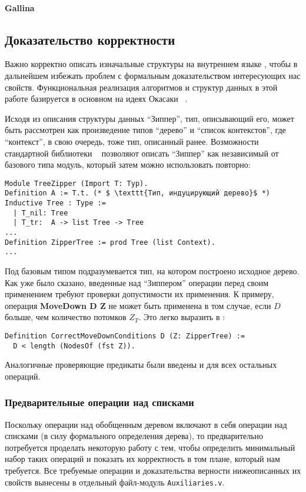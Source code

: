 \paragraph{Gallina}


\subsection{Доказательство корректности}

Важно корректно описать изначальные структуры на внутреннем языке \tcoq, чтобы в дальнейшем избежать проблем с формальным доказательством интересующих нас свойств. Функциональная реализация алгоритмов и структур данных в этой работе базируется в основном на идеях Окасаки ~\autocite{Okasaki1996}.

Исходя из описания структуры данных ``Зиппер'', тип, описывающий его, может быть рассмотрен как произведение типов ``дерево'' и ``список контекстов'', где ``контекст'', в свою очередь, тоже тип, описанный ранее. Возможности стандартной библиотеки \tcoq~ позволяют описать ``Зиппер'' как независимый от базового типа модуль, который затем можно использовать повторно:

\begin{lstlisting}
Module TreeZipper (Import T: Typ).
Definition A := T.t. (* $ \texttt{Тип, индуцирующий дерево}$ *)
Inductive Tree : Type :=
  | T_nil: Tree
  | T_tr:  A -> list Tree -> Tree
...
Definition ZipperTree := prod Tree (list Context).
...
\end{lstlisting}

Под базовым типом подразумевается тип, на котором построено исходное дерево. Как уже было сказано, введенные над ``Зиппером'' операции перед своим применением требуют проверки допустимости их применения. К примеру, операция \textbf{MoveDown D Z} не может быть применена в том случае, если $D$ больше, чем количество потомков $Z_T$. Это легко выразить в \tcoq:
\begin{lstlisting}
Definition CorrectMoveDownConditions D (Z: ZipperTree) :=
  D < length (NodesOf (fst Z)).
\end{lstlisting}
Аналогичные проверяющие предикаты были введены и для всех остальных операций.

\subsubsection{Предварительные операции над списками}

Поскольку операции над обобщенным деревом включают в себя операции над списками (в силу формального определения дерева), то предварительно потребуется проделать некоторую работу с тем, чтобы определить минимальный набор таких операций и показать их корректность в том плане, который нам требуется. Все требуемые операции и доказательства верности нижеописанных их свойств вынесены в отдельный файл-модуль \texttt{Auxiliaries.v}.

